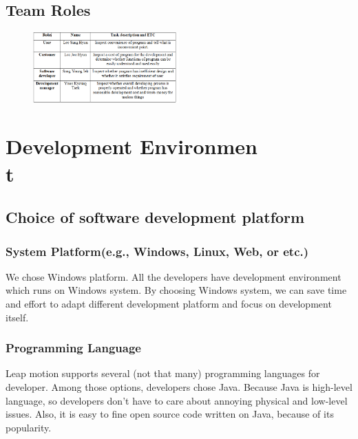 \documentclass[10pt,journal,compsoc]{IEEEtran}
\begin{document}
\subsection{Team Roles}
\begin{figure}[H]
\centering
\includegraphics[width=0.5\textwidth]{names.png}
{\caption*{}}
\end{figure}

\ifCLASSOPTIONcompsoc
{}
\else
\section{Development Environmen\\t}
\label{sec:Development Environment\\}
\fi

\subsection{Choice of software development platform}

\subsubsection{System Platform(e.g., Windows, Linux, Web, or etc.)}

We chose Windows platform. All the developers have development environment which runs on Windows system. By choosing Windows system, we can save time and effort to adapt different development platform and focus on development itself.

\subsubsection{Programming Language}

Leap motion supports several (not that many) programming languages for developer. Among those options, developers chose Java. Because Java is high-level language, so developers don’t have to care about annoying physical and low-level issues. Also, it is easy to fine open source code written on Java, because of its popularity.
\end{document}
